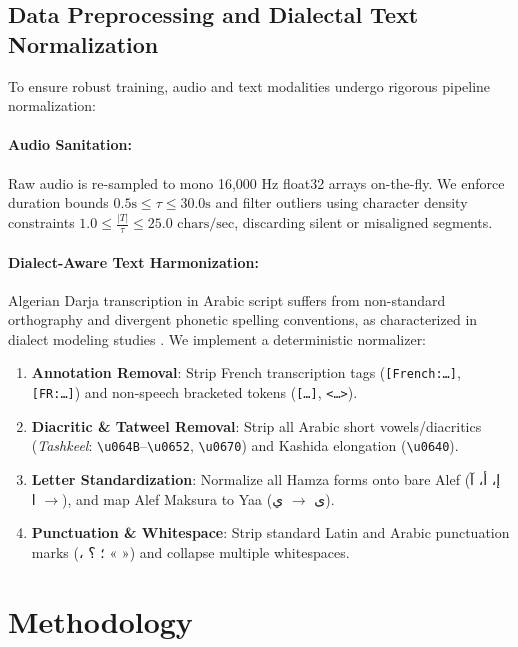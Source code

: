 \documentclass[11pt,a4paper]{article}
\providecommand{\textarabic}[1]{\foreignlanguage{arabic}{#1}}
\begin{document}
\subsection{Data Preprocessing and Dialectal Text Normalization}
To ensure robust training, audio and text modalities undergo rigorous pipeline normalization:

\paragraph{Audio Sanitation:} Raw audio is re-sampled to mono 16,000 Hz float32 arrays on-the-fly. We enforce duration bounds $0.5\text{s} \le \tau \le 30.0\text{s}$ and filter outliers using character density constraints $1.0 \le \frac{|T|}{\tau} \le 25.0 \text{ chars/sec}$, discarding silent or misaligned segments.

\paragraph{Dialect-Aware Text Harmonization:} Algerian Darja transcription in Arabic script suffers from non-standard orthography and divergent phonetic spelling conventions, as characterized in dialect modeling studies \cite{abdaoui2021dziribert}. We implement a deterministic normalizer:
\begin{enumerate}[leftmargin=*]
    \item \textbf{Annotation Removal}: Strip French transcription tags (\texttt{[French:\dots]}, \texttt{[FR:\dots]}) and non-speech bracketed tokens (\texttt{[\dots]}, \texttt{<\dots>}).
    \item \textbf{Diacritic \& Tatweel Removal}: Strip all Arabic short vowels/diacritics (\textit{Tashkeel}: \texttt{\textbackslash u064B}--\texttt{\textbackslash u0652}, \texttt{\textbackslash u0670}) and Kashida elongation (\texttt{\textbackslash u0640}).
    \item \textbf{Letter Standardization}: Normalize all Hamza forms onto bare Alef (\textarabic{إ، أ، آ} $\rightarrow$ \textarabic{ا}), and map Alef Maksura to Yaa (\textarabic{ى} $\rightarrow$ \textarabic{ي}).
    \item \textbf{Punctuation \& Whitespace}: Strip standard Latin and Arabic punctuation marks (\textarabic{،} \textarabic{؛} \textarabic{؟} « ») and collapse multiple whitespaces.
\end{enumerate}

\section{Methodology}
\label{sec:methodology}
\end{document}

